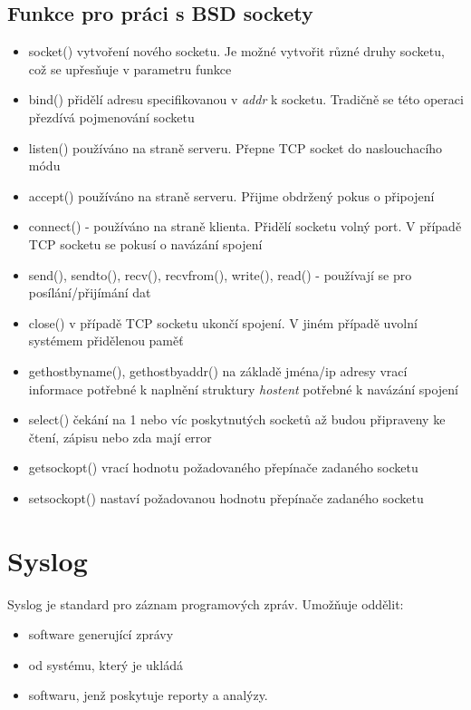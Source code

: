 \documentclass[a4paper]{article}
\begin{document}
	\subsection{Funkce pro práci s BSD sockety}
	\begin{itemize}
	\item socket() vytvoření nového socketu. Je možné vytvořit různé druhy socketu, což se upřesňuje v parametru funkce
	\item bind() přidělí adresu specifikovanou v \emph{addr} k socketu. Tradičně se této operaci přezdívá pojmenování socketu
	\item listen() používáno na straně serveru. Přepne TCP socket do naslouchacího módu
	\item accept() používáno na straně serveru. Přijme obdržený pokus o připojení
	\item connect() - používáno na straně klienta. Přidělí socketu volný port. V případě TCP socketu se pokusí o navázání spojení
	\item send(), sendto(), recv(), recvfrom(), write(), read() - používají se pro posílání/přijímání dat
	\item close() v případě TCP socketu ukončí spojení. V jiném případě uvolní systémem přidělenou paměť
	\item gethostbyname(), gethostbyaddr() na základě jména/ip adresy vrací informace potřebné k naplnění struktury \emph{hostent} potřebné k navázání spojení
	\item select() čekání na 1 nebo víc poskytnutých socketů až budou připraveny ke čtení, zápisu nebo zda mají error
	\item getsockopt() vrací hodnotu požadovaného přepínače zadaného socketu
	\item setsockopt() nastaví požadovanou hodnotu přepínače zadaného socketu
	\end{itemize}

	\section{Syslog}

	Syslog je standard pro záznam programových zpráv. Umožňuje oddělit:
	\begin{itemize}
	\item software generující zprávy
	\item od systému, který je ukládá
	\item softwaru, jenž poskytuje reporty a analýzy.
	\end{itemize}
\end{document}
